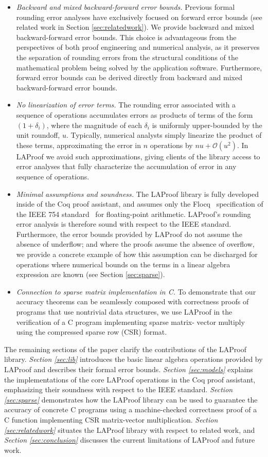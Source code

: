 \begin{itemize}
\item \emph{Backward and mixed backward-forward error bounds.}
Previous formal rounding error analyses have exclusively focused on forward error bounds (see related work in Section
\ref{sec:relatedwork}).  We provide backward and mixed backward-forward error
bounds. This choice is advantageous from the perspectives
of both proof engineering and numerical analysis, as it preserves the separation of rounding errors from the structural conditions of
the mathematical problem being solved by the application
software. Furthermore, forward error bounds can be derived
directly from backward and mixed backward-forward error bounds.
\item \emph{No linearization of error terms.} The rounding error associated with a sequence of operations accumulates errors as
products of terms of the form $(1+\delta_i)$, where the
magnitude of each $\delta_i$ is uniformly upper-bounded by the
unit roundoff, $u$. Typically, numerical analysts simply
linearize the product of these terms, approximating the error in $n$ operations by $nu + \mathcal{O}(u^2)$. In LAProof we avoid
such approximations, giving clients of the library access to
error analyses that fully characterize the accumulation of error in any sequence of operations.
\item \emph{Minimal assumptions and soundness.} The LAProof
library is fully developed inside of the Coq proof assistant,
and assumes only the Flocq~\cite{flocq} specification of the
IEEE 754 standard~\cite{IEEEstd} for floating-point arithmetic.
LAProof's rounding error analysis is therefore
sound with respect to the IEEE standard. Furthermore, the
error bounds provided by LAProof do not assume
the absence of underflow; and where the proofs assume the
absence
of overflow, we provide a concrete example of how this
assumption can be discharged for operations where numerical
bounds on the terms in a linear algebra expression are known
(see Section \ref{sec:sparse}).
\item \emph{Connection to sparse matrix implementation in C.}
To demonstrate that our accuracy theorems can be seamlessly 
composed with correctness proofs of programs that
use nontrivial data structures, we use LAProof in the
verification of a C program implementing sparse matrix-
vector multiply using the compressed sparse row (CSR)
format.
\end{itemize}

The remaining sections of the paper clarify the contributions of the LAProof library. \emph{Section \ref{sec:lib}} introduces the basic linear algebra operations provided by LAProof and describes their formal error bounds. \emph{Section \ref{sec:models}} explains the implementations of the core LAProof operations in the Coq proof assistant, emphasizing their soundness with respect to the IEEE standard. \emph{Section \ref{sec:sparse}} demonstrates how the LAProof library can be used to guarantee the accuracy of concrete C programs using a machine-checked correctness proof of a C function implementing CSR matrix-vector multiplication. \emph{Section \ref{sec:relatedwork}} situates the LAProof library with respect to related work, and \emph{Section \ref{sec:conclusion}} discusses the current limitations of LAProof and future work.